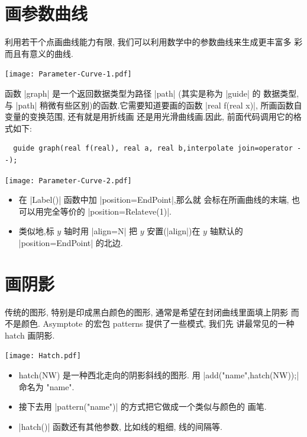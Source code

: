 \documentclass[nofonts,CJKnormalspaces]{ctexbook}[2009/05/20]
\begin{document}
\section{画参数曲线}
利用若干个点画曲线能力有限, 我们可以利用数学中的参数曲线来生成更丰富多
彩而且有意义的曲线.
\begin{center}\texttt{[image: Parameter-Curve-1.pdf]}\end{center}%


函数 |graph| 是一个返回数据类型为路径 |path| (其实是称为 |guide| 的
数据类型, 与 |path| 稍微有些区别)的函数.它需要知道要画的函数
|real f(real x)|,  所画函数自变量的变换范围, 还有就是用折线画
还是用光滑曲线画.因此, 前面代码调用它的格式如下:
\begin{lstlisting}
  guide graph(real f(real), real a, real b,interpolate join=operator --);
\end{lstlisting}
\begin{center}\texttt{[image: Parameter-Curve-2.pdf]}\end{center}%


\begin{itemize}
\item 在 |Label()| 函数中加 |position=EndPoint|,那么就
  会标在所画曲线的末端, 也可以用完全等价的 |position=Relateve(1)|.
\item  类似地,标 $y$ 轴时用 |align=N| 把 $y$ 安置(|align|)在 $y$ 轴默认的
  |position=EndPoint| 的北边.
\end{itemize}

\section{画阴影}
传统的图形, 特别是印成黑白颜色的图形, 通常是希望在封闭曲线里面填上阴影
而不是颜色. Asymptote 的宏包 {patterns} 提供了一些模式, 我们先
讲最常见的一种 hatch 画阴影.
\begin{center}\texttt{[image: Hatch.pdf]}\end{center}%

\begin{itemize}
\item {hatch(NW)} 是一种西北走向的阴影斜线的图形. 用
  |add("name",hatch(NW));| 命名为 "name".
\item 接下去用 |pattern("name")| 的方式把它做成一个类似与颜色的
  画笔.
\item |hatch()| 函数还有其他参数, 比如线的粗细, 线的间隔等.
\end{itemize}
\end{document}

